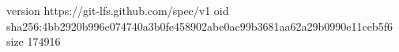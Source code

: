 version https://git-lfs.github.com/spec/v1
oid sha256:4bb2920b996c074740a3b0fe458902abe0ac99b3681aa62a29b0990e11ceb5f6
size 174916
